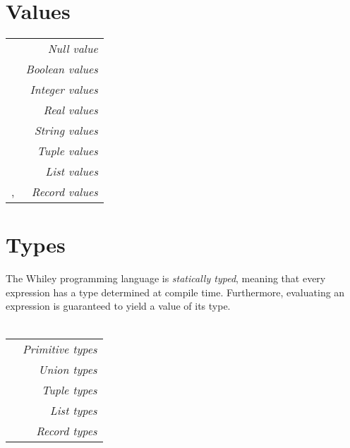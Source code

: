 \documentclass[a4paper,10pt,twcolumn]{article}
\date{}
\newcommand{\token}[1]{\Large\strut\scriptsize\fcolorbox{black}{lightgray}{\strut#1}}
\begin{document}

\section*{Values}
\begin{tabular}{l r}
\token{\lstinline+null+} & {\em Null value}\\
\token{\lstinline+true+} \token{\lstinline+false+} & {\em Boolean values}\\
\token{\lstinline+123+} \token{\lstinline+-99+} \token{\lstinline+0xFF+} & {\em Integer values}\\
\token{\lstinline+1.23+} \token{\lstinline+-0.02+} & {\em Real values}\\
\token{\lstinline+"Hello"+} \token{\lstinline+"new\n line"+} & {\em String values}\\
\token{\lstinline+(1,2,3)+} \token{\lstinline+(true,null)+} & {\em Tuple values}\\
\token{\lstinline+[]+} \token{\lstinline+[1,2,3]+} \token{\lstinline+[1,"hello",2.0]+} & {\em List values}\\
\token{\lstinline+\{name: "dave"\}+}, \token{\lstinline+\{x: 1, y: 0\}+} & {\em Record values}\\
\end{tabular}
\section*{Types}
The Whiley programming language is {\em statically typed}, meaning that every expression has a type determined at compile time.  Furthermore, evaluating an expression is guaranteed to yield a value of its type.\\\\ 
\begin{tabular}{l r}
\token{\lstinline+null+} \token{\lstinline+bool+} \token{\lstinline+int+} \token{\lstinline+real+} \token{\lstinline+string+} & {\em Primitive types}\\
\token{\lstinline+int|null+} \token{\lstinline+bool|int|real+} & {\em Union types}\\
\token{\lstinline+(int,int)+} \token{\lstinline+(int,null,bool)+} & {\em Tuple types}\\
\token{\lstinline+[int]+} \token{\lstinline+[[bool]]+} \token{\lstinline+[int|null]+} & {\em List types}\\
\token{\lstinline+\{bool f\}+} \token{\lstinline+\{int len, [int] is\}+} & {\em Record types}\\
\end{tabular}
\end{document}
